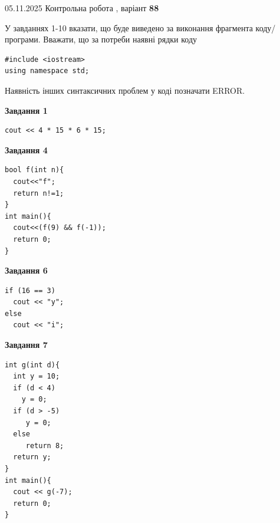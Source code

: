 \documentclass[12pt, ukrainian]{article}
\begin{document}
\newpage

{\Large{05.11.2025 Контрольна робота , варіант  \No \textbf { 88 }\par}}
{
\begin {large}
У завданнях 1-10 вказати, що буде виведено за виконання фрагмента коду/про\-гра\-ми.
Вважати, що за потреби наявні рядки коду
\begin{verbatim}
#include <iostream>
using namespace std;
\end{verbatim}
Наявність інших синтаксичних проблем у коді позначати ERROR.

\begin{minipage}[t]{7.0cm}

\begin{center}
\textbf{Завдання 1}
\end{center}
\vspace{-8mm}

\begin{verbatim}
cout << 4 * 15 * 6 * 15;
\end{verbatim}



\begin{center}
\textbf{Завдання 4}
\end{center}
\vspace{-8mm}

\begin{verbatim}
bool f(int n){
  cout<<"f";
  return n!=1;
}
int main(){
  cout<<(f(9) && f(-1));
  return 0;
}
\end{verbatim}



\begin{center}
\textbf{Завдання 6}
\end{center}
\vspace{-8mm}

\begin{verbatim}
if (16 == 3)
  cout << "y";
else
  cout << "i";
\end{verbatim}



\begin{center}
\textbf{Завдання 7}
\end{center}
\vspace{-8mm}

\begin{verbatim}
int g(int d){
  int y = 10;
  if (d < 4)
    y = 0;
  if (d > -5)
     y = 0;
  else
     return 8;
  return y;
}
int main(){
  cout << g(-7);
  return 0;
}
\end{verbatim}


\end{minipage}
\end{large}}
\end{document}
